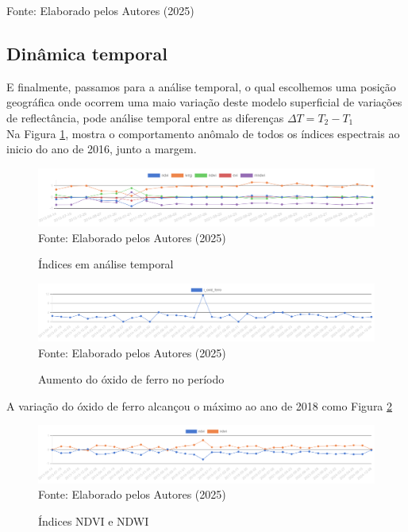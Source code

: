 			 			\begin{center}
				Fonte:   Elaborado pelos Autores (2025)
			\end{center}
 
 
 
\subsection{Dinâmica temporal }
\hspace*{1.25 cm} E finalmente, passamos para a análise temporal, o qual escolhemos uma posição geográfica onde ocorrem uma maio variação deste modelo superficial de variações de reflectância, pode análise temporal entre as diferenças  \( \Delta T = T_{2}  - T_{1} \)\\
%
\hspace*{1.25 cm}  Na Figura \ref{fig:INDICES}, mostra o comportamento anômalo de todos os índices espectrais ao inicio do ano de 2016, junto a margem.\\

 \begin{figure}[H]
	\centering  \small \caption{Índices em  análise temporal}
	\includegraphics[width=0.97\linewidth]{FIGURAS/indices}
	\label{fig:INDICES}{ Fonte:   Elaborado pelos Autores (2025)}
\end{figure}

 \begin{figure}[H]
	\centering  \small \caption{Aumento do óxido de ferro no período}
	\includegraphics[width=0.97\linewidth]{FIGURAS/graphvisualiser-1747928533564}
	\label{fig:INDICES2}{ Fonte:   Elaborado pelos Autores (2025)}
\end{figure}

\hspace*{1.25 cm} A variação do óxido de ferro alcançou o máximo ao ano de 2018 como Figura \ref{fig:INDICES2}\\
%
\begin{figure}[H]
	\centering  \small \caption{Índices NDVI e NDWI}
	\includegraphics[width=0.97\linewidth]{FIGURAS/graphvisualiser-1747928457345}
	\label{fig:INDICES3}{ Fonte:   Elaborado pelos Autores (2025)}
\end{figure}



